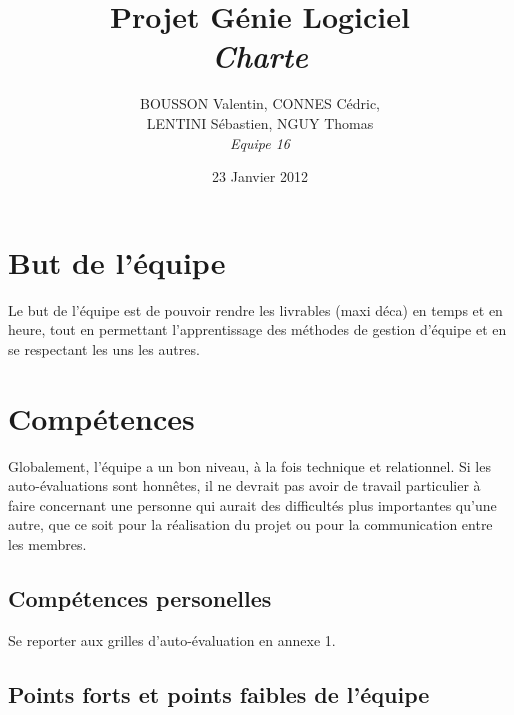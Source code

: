 \documentclass[11pt]{article}
\title{Projet Génie Logiciel\\\emph{Charte}}
\author{BOUSSON Valentin, CONNES Cédric,\\LENTINI Sébastien, NGUY Thomas\\\emph{Equipe 16}}
\date{23 Janvier 2012}
\begin{document}
\maketitle

\section{But de l'équipe}
Le but de l'équipe est de pouvoir rendre les livrables (maxi déca) en temps et en heure, tout en permettant l'apprentissage des méthodes de gestion d'équipe et en se respectant les uns les autres. 

\section{Compétences}
Globalement, l'équipe a un bon niveau, à la fois technique et relationnel. Si les auto-évaluations sont honnêtes, il ne devrait pas avoir de travail particulier à faire concernant une personne qui aurait des difficultés plus importantes qu'une autre, que ce soit pour la réalisation du projet ou pour la communication entre les membres.

\subsection{Compétences personelles}
Se reporter aux grilles d'auto-évaluation en annexe 1.

\subsection{Points forts et points faibles de l'équipe}
\end{document}
